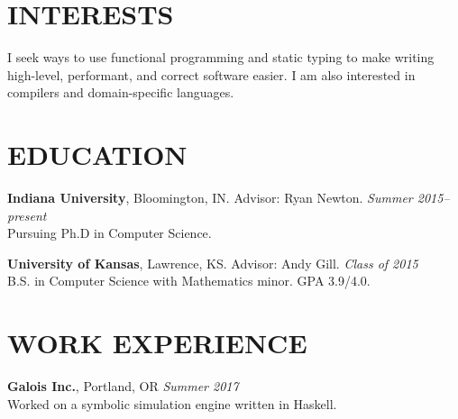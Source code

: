 \documentclass{res}
\begin{document}
\address{\texttt{rgscott@indiana.edu} $\bullet$ \texttt{ryanglscott.github.io}}

\begin{resume}

\section{INTERESTS}
    I seek ways to use functional programming and static typing to make writing high-level, performant, and correct software easier. I am also interested in compilers and domain-specific languages.

\section{EDUCATION}
     \textbf{Indiana University}, Bloomington, IN. Advisor: Ryan Newton. \hfill \textit{Summer 2015--present} \\
    Pursuing Ph.D in Computer Science.

     \textbf{University of Kansas}, Lawrence, KS. Advisor: Andy Gill. \hfill \textit{Class of 2015} \\
    B.S. in Computer Science with Mathematics minor. GPA 3.9/4.0.

\section{WORK EXPERIENCE}
    \textbf{Galois Inc.}, Portland, OR \hfill \textit{Summer 2017} \\
    Worked on a symbolic simulation engine written in Haskell.


\end{resume}
\end{document}
